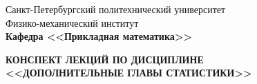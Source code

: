 \documentclass[main.tex]{subfiles}
\begin{document}
	\begin{titlepage}
		\begin{center}
			\begin{large}
				Санкт-Петербургский политехнический университет\\
				Физико-механический институт\\
				\textbf{Кафедра <<Прикладная математика>>}\\
			\end{large}
			\vfill
			\Large{\textbf{КОНСПЕКТ ЛЕКЦИЙ ПО ДИСЦИПЛИНЕ \\
					<<ДОПОЛНИТЕЛЬНЫЕ ГЛАВЫ СТАТИСТИКИ>>}}
		\end{center}
		\vfill
		\begin{figure}[H]
		\end{figure}
		\vfill
	\end{titlepage}
\end{document}
